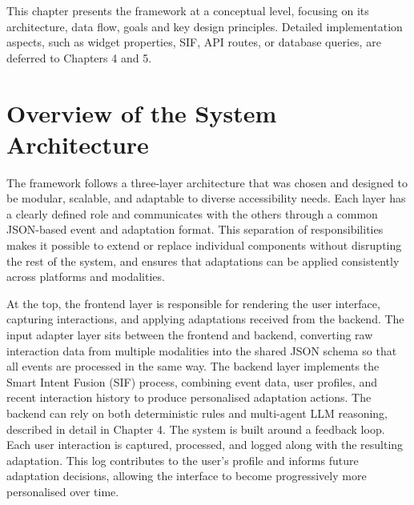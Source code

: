 \documentclass[openany]{book}
\begin{document}
This chapter presents the framework at a conceptual level, focusing on its architecture, data flow, goals and key design principles. Detailed implementation aspects, such as widget properties, SIF, API routes, or database queries, are deferred to Chapters 4 and 5.

\section{Overview of the System Architecture}
The framework follows a three-layer architecture that was chosen and designed to be modular, scalable, and adaptable to diverse accessibility needs. Each layer has a clearly defined role and communicates with the others through a common JSON-based event and adaptation format. This separation of responsibilities makes it possible to extend or replace individual components without disrupting the rest of the system, and ensures that adaptations can be applied consistently across platforms and modalities.

At the top, the frontend layer is responsible for rendering the user interface, capturing interactions, and applying adaptations received from the backend. The input adapter layer sits between the frontend and backend, converting raw interaction data from multiple modalities into the shared JSON schema so that all events are processed in the same way. The backend layer implements the Smart Intent Fusion (SIF) process, combining event data, user profiles, and recent interaction history to produce personalised adaptation actions. The backend can rely on both deterministic rules and multi-agent LLM reasoning, described in detail in Chapter 4. 
The system is built around a feedback loop. Each user interaction is captured, processed, and logged along with the resulting adaptation. This log contributes to the user’s profile and informs future adaptation decisions, allowing the interface to become progressively more personalised over time.
\end{document}
